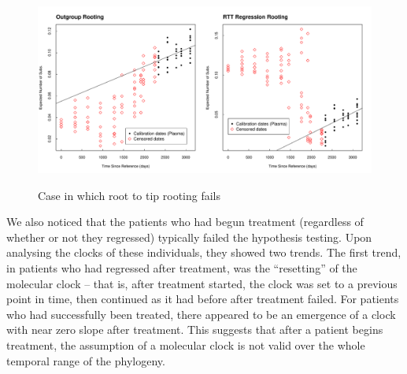 \begin{figure}[!ht] \label{fig:degenerate_example}
	\centering
	\includegraphics[scale=0.425]{figures/rtt.pdf} \\
	\caption[Example of bad root]{ Case in which root to tip rooting fails}
\end{figure}

We also noticed that the patients who had begun treatment (regardless of whether or not they regressed) typically failed the hypothesis testing. Upon analysing the clocks of these individuals, they showed two trends. 
The first trend, in patients who had regressed after treatment, was the ``resetting'' of the molecular clock -- that is, after treatment started, the clock was set to a previous point in time, then continued as it had before after treatment failed. 
For patients who had successfully been treated, there appeared to be an emergence of a clock with near zero slope after treatment.
This suggests that after a patient begins treatment, the assumption of a molecular clock  is not valid over the whole temporal range of the phylogeny. 

